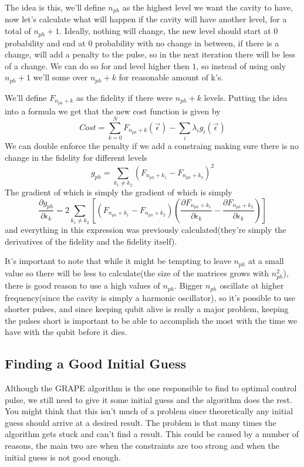 \documentclass[english, a4paper, 12pt, twoside]{article}
\numberwithin{equation}{section} %
\begin{document}
The idea is this, we'll define $n_{ph}$ as the highest level we want the cavity to have, now let's calculate what will happen if the cavity will have another level, for a total of $n_{ph} + 1$. Ideally, nothing will change, the new level should start at 0 probability and end at 0 probability with no change in between, if there is a change, will add a penalty to the pulse, so in the next iteration there will be less of a change. We can do so for and level higher then $1$, so instead of using only $n_{ph} + 1$ we'll some over $n_{ph} + k$ for reasonable amount of k's.

We'll define $F_{n_{ph} + k}$ as the fidelity if there were $n_{ph} + k$ levels. Putting the idea into a formula we get that the new cost function is given by
\[
    Cost = \sum_{k=0}^{N} F_{n_{ph} + k} (\vec{\epsilon}) - \sum_i \lambda_i g_i (\vec{\epsilon})
\]
We can double enforce the penalty if we add a constraing making sure there is no change in the fidelity for different levels
\[
    g_{ph} = \sum_{k_1 \ne k_2} (F_{n_{ph} + k_1} - F_{n_{ph} + k_2})^2
\]
The gradient of which is simply the gradient of which is simply
\[
    \frac{\partial g_{ph}}{\partial \epsilon_k} = 2 \sum_{k_1 \ne k_2} [(F_{n_{ph} + k_1} - F_{n_{ph} + k_2})(\frac{\partial F_{n_{ph} + k_1}}{\partial \epsilon_k} - \frac{\partial F_{n_{ph} + k_2}}{\partial \epsilon_k})]
\]
and everything in this expression was previously calculated(they're simply the derivatives of the fidelity and the fidelity itself).

It's important to note that while it might be tempting to leave $n_{ph}$ at a small value so there will be less to calculate(the size of the matrices grows with $n_{ph}^2$), there is good reason to use a high values of $n_{ph}$. Bigger $n_{ph}$ oscillate at higher frequency(since the cavity is simply a harmonic oscillator), so it's possible to use shorter pulses, and since keeping qubit alive is really a major problem, keeping the pulses short is important to be able to accomplish the most with the time we have with the qubit before it dies.

\subsection{Finding a Good Initial Guess}
Although the GRAPE algorithm is the one responsible to find to optimal control pulse, we still need to give it some initial guess and the algorithm does the rest. You might think that this isn't much of a problem since theoretically any initial guess should arrive at a desired result. The problem is that many times the algorithm gets stuck and can't find a result. This could be caused by a number of reasons, the main two are when the constraints are too strong and when the initial guess is not good enough.
\end{document}
